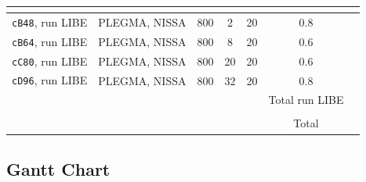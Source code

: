 \documentclass[a4paper,12pt]{article}
\newif\ifshowinstructions
\newcommand{\instructions}[1]{\ifshowinstructions {\fontsize{10}{11}\selectfont #1} \fi}
\newcommand{\hrsBS}{0.8}
\newcommand{\hrsB}{0.6}
\newcommand{\hrsBL}{0.8}
\newcommand{\hrsC}{0.6}
\newcommand{\hrsCL}{0.7}
\newcommand{\hrsD}{0.8}
\newcommand{\hrsDL}{0.6}
\newcommand{\hrsE}{0.7}
\newcommand{\rAB}{120*8*10}
\newcommand{\rABL}{200*32*12}
\newcommand{\rAC}{400*20*13}
\newcommand{\rACL}{410*56*5}
\newcommand{\rAD}{300*32*10}
\newcommand{\rADL}{500*128*3}
\newcommand{\rAE}{700*56*6}
\newcommand{\rBBS}{800*2*20}
\newcommand{\rBB}{800*8*20}
\newcommand{\rBC}{800*20*20}
\newcommand{\rBD}{800*32*20}
\begin{document}
\begin{table}[h!]
\begin{tabular}{|c|c|c|c|c|c|c|}
      \multicolumn{7}{c}{}                                                                                                                                                                                                                        \\\hline
      \texttt{cB48}, run LIBE & PLEGMA, NISSA & 800 & 2 & 20 & \hrsBS{} & \fpeval{\hrsBS{}*\rBBS{}} \\\hline
      \texttt{cB64}, run LIBE & PLEGMA, NISSA & 800 & 8 & 20 & \hrsB{} & \fpeval{\hrsB{}*\rBB{}} \\\hline
      \texttt{cC80}, run LIBE & PLEGMA, NISSA & 800 & 20 & 20 & \hrsC{} & \fpeval{\hrsC{}*\rBC{}} \\\hline
      \texttt{cD96}, run LIBE & PLEGMA, NISSA & 800 & 32 & 20 & \hrsD{} & \fpeval{\hrsD{}*\rBD{}} \\\hline
      \multicolumn{5}{r|}{}            & Total run LIBE & \fpeval{\hrsBS{}*\rBBS{}+\hrsB{}*\rBB{}+\hrsC{}*\rBC{}+\hrsD{}*\rBD{}}                                                                                                                                \\\cline{6-7}
      \multicolumn{7}{c}{}                                                                                                                                                                                                                        \\\cline{6-7}
      \multicolumn{5}{r|}{}            & Total                & \fpeval{\hrsB{}*\rAB{}+\hrsBL{}*\rABL{}+\hrsC{}*\rAC{}+\hrsCL{}*\rACL{}+\hrsD{}*\rAD{}+\hrsDL{}*\rADL{}+\hrsE{}*\rAE{}+\hrsBS{}*\rBBS{}+\hrsB{}*\rBB{}+\hrsC{}*\rBC{}+\hrsD{}*\rBD{}}                                                                                                                                                                       \\\cline{6-7}
    \end{tabular}
    \label{table:costs}
\end{table}

\subsection{Gantt Chart}
\instructions{\it

  Provide a Gantt Chart of the simulation plan in production indicating job sizes and scheduling of computing tasks including a communication plan for the results and the strategy and timeline for the dissemination of the results.

} 
\end{document}
